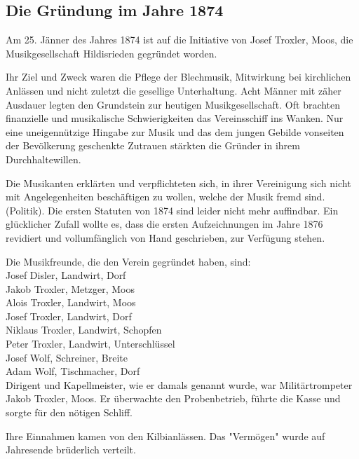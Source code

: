 \begin{multicols}{2}

    \subsection{Die Gründung im Jahre 1874}

    Am 25. Jänner des Jahres 1874 ist auf die Initiative von Josef Troxler,
    Moos, die Musikgesellschaft Hildisrieden gegründet worden.

    Ihr Ziel und Zweck waren die Pflege der Blechmusik, Mitwirkung bei
    kirchlichen Anlässen und nicht zuletzt die gesellige Unterhaltung. Acht
    Männer mit zäher Ausdauer legten den Grundstein zur heutigen
    Musikgesellschaft. Oft brachten finanzielle und musikalische Schwierigkeiten
    das Vereinsschiff ins Wanken. Nur eine uneigennützige Hingabe zur Musik und
    das dem jungen Gebilde vonseiten der Bevölkerung geschenkte Zutrauen
    stärkten die Gründer in ihrem Durchhaltewillen.

    Die Musikanten erklärten und verpflichteten sich, in ihrer Vereinigung sich
    nicht mit Angelegenheiten beschäftigen zu wollen, welche der Musik fremd
    sind. (Politik). Die ersten Statuten von 1874 sind leider nicht mehr
    auffindbar. Ein glücklicher Zufall wollte es, dass die ersten Aufzeichnungen
    im Jahre 1876 revidiert und vollumfänglich von Hand geschrieben, zur
    Verfügung stehen.

    Die Musikfreunde, die den Verein gegründet haben, sind:\\

    \noindent
    Josef Disler, Landwirt, Dorf\\
    Jakob Troxler, Metzger, Moos\\
    Alois Troxler, Landwirt, Moos\\
    Josef Troxler, Landwirt, Dorf\\
    Niklaus Troxler, Landwirt, Schopfen\\
    Peter Troxler, Landwirt, Unterschlüssel\\
    Josef Wolf, Schreiner, Breite\\
    Adam Wolf, Tischmacher, Dorf\\


    Dirigent und Kapellmeister, wie er damals genannt wurde, war
    Militärtrompeter Jakob Troxler, Moos. Er überwachte den Probenbetrieb,
    führte die Kasse und sorgte für den nötigen Schliff.

    Ihre Einnahmen kamen von den Kilbianlässen. Das "Vermögen" wurde auf
    Jahresende brüderlich verteilt.

\end{multicols}

